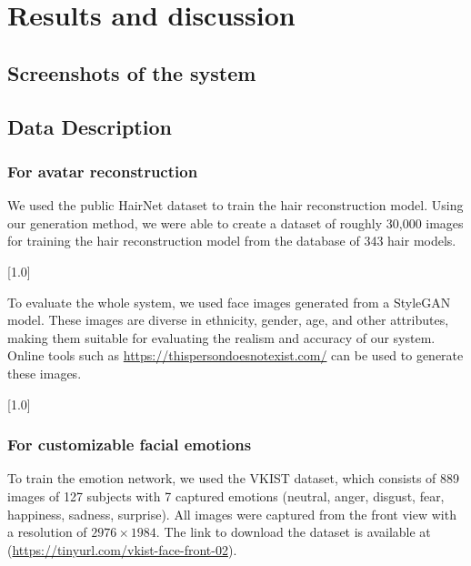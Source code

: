 \section{Results and discussion}\label{sec:results}

\subsection{Screenshots of the system}

\subsection{Data Description}
\subsubsection{For avatar reconstruction}

We used the public HairNet dataset \cite{zhouHairNetSingleViewHair2018} to train the hair reconstruction model. Using our generation method, we were able to create a dataset of roughly 30,000 images for training the hair reconstruction model from the database of 343 hair models.

[1.0]

\label{sec:results/stylegan-dataset}
To evaluate the whole system, we used face images generated from a StyleGAN \cite{karrasStyleBasedGeneratorArchitecture2019} model. These images are diverse in ethnicity, gender, age, and other attributes, making them suitable for evaluating the realism and accuracy of our system. Online tools such as \url{https://thispersondoesnotexist.com/} can be used to generate these images.

[1.0]

\subsubsection{For customizable facial emotions}
To train the emotion network, we used the VKIST dataset, which consists of 889 images of 127 subjects with 7 captured emotions (neutral, anger, disgust, fear, happiness, sadness, surprise). All images were captured from the front view with a resolution of $2976\times1984$. The link to download the dataset is available at (\url{https://tinyurl.com/vkist-face-front-02}).

